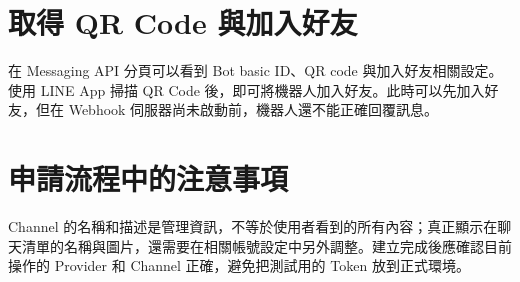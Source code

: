 \section{取得 QR Code 與加入好友}
在 Messaging API 分頁可以看到 Bot basic ID、QR code 與加入好友相關設定。使用 LINE App 掃描 QR Code 後，即可將機器人加入好友。此時可以先加入好友，但在 Webhook 伺服器尚未啟動前，機器人還不能正確回覆訊息。

\section{申請流程中的注意事項}
Channel 的名稱和描述是管理資訊，不等於使用者看到的所有內容；真正顯示在聊天清單的名稱與圖片，還需要在相關帳號設定中另外調整。建立完成後應確認目前操作的 Provider 和 Channel 正確，避免把測試用的 Token 放到正式環境。
